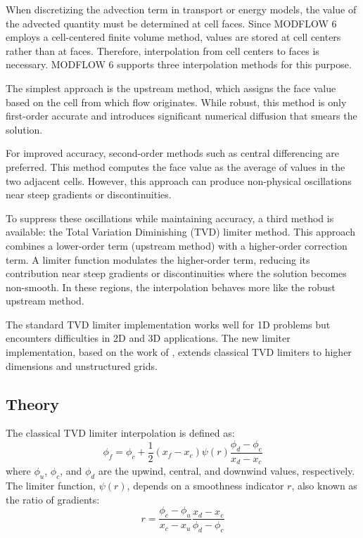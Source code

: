 When discretizing the advection term in transport or energy models, the value of the advected quantity must be determined at cell faces.
Since MODFLOW 6 employs a cell-centered finite volume method, values are stored at cell centers rather than at faces.
Therefore, interpolation from cell centers to faces is necessary.
MODFLOW 6 supports three interpolation methods for this purpose.

The simplest approach is the upstream method, which assigns the face value based on the cell from which flow originates. While robust, this method is only first-order accurate and introduces significant numerical diffusion that smears the solution.

For improved accuracy, second-order methods such as central differencing are preferred.
This method computes the face value as the average of values in the two adjacent cells. However, this approach can produce non-physical oscillations near steep gradients or discontinuities.

To suppress these oscillations while maintaining accuracy, a third method is available: the Total Variation Diminishing (TVD) limiter method. This approach combines a lower-order term (upstream method) with a higher-order correction term. A limiter function modulates the higher-order term, reducing its contribution near steep gradients or discontinuities where the solution becomes non-smooth. In these regions, the interpolation behaves more like the robust upstream method.

The standard TVD limiter implementation works well for 1D problems but encounters difficulties in 2D and 3D applications. The new limiter implementation, based on the work of \cite{Darwish2003}, extends classical TVD limiters to higher dimensions and unstructured grids.

\subsection{Theory}

The classical TVD limiter interpolation is defined as:
\begin{equation}
\phi_f = \phi_c + \frac{1}{2} \left({x_f-x_c}\right) \psi\left(r\right) \frac{\phi_d - \phi_c}{x_d-x_c}
\end{equation}
where $\phi_u$, $\phi_c$, and $\phi_d$ are the upwind, central, and downwind values, respectively. The limiter function, $\psi\left(r\right)$, depends on a smoothness indicator $r$, also known as the ratio of gradients:
\begin{equation}
r = \frac{\phi_c - \phi_u}{x_c - x_u} \frac{x_d - x_c}{\phi_d - \phi_c}
\end{equation}

